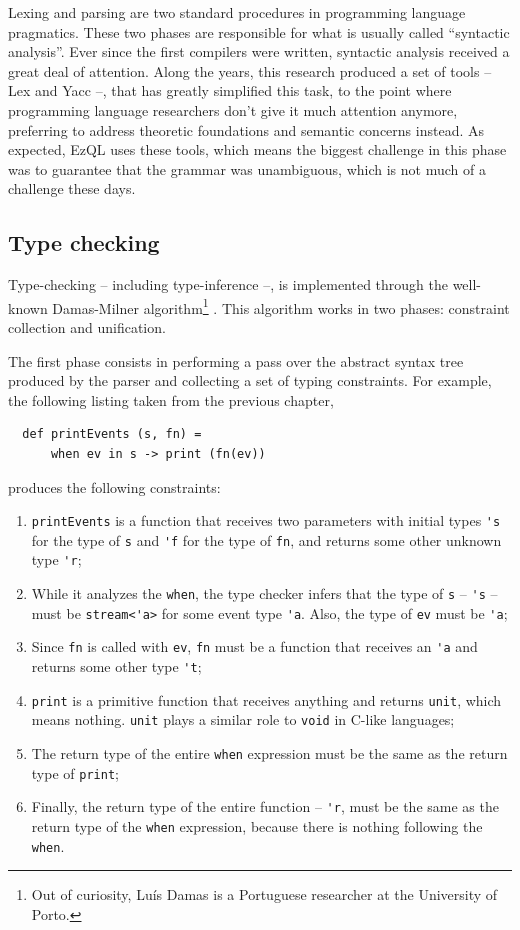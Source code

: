 Lexing and parsing are two standard procedures in programming language
pragmatics. These two phases are responsible for what is usually
called ``syntactic analysis''. Ever since the first compilers were
written, syntactic analysis received a great deal of attention. Along
the years, this research produced a set of tools -- Lex and Yacc
\cite{lex-yacc} --, that has greatly simplified this task, to the
point where programming language researchers don't give it much
attention anymore, preferring to address theoretic foundations and
semantic concerns instead. As expected, EzQL uses these tools, which
means the biggest challenge in this phase was to guarantee that the
grammar was unambiguous, which is not much of a challenge these days.

\subsection{Type checking}
\label{sub:type-checking}

Type-checking -- including type-inference --, is implemented through
the well-known Damas-Milner algorithm\footnote{Out of curiosity,
  Lu\'{i}s Damas is a Portuguese researcher at the University of
  Porto.} \cite{damas-milner}. This algorithm works in two phases:
constraint collection and unification.

The first phase consists in performing a pass over the abstract syntax
tree produced by the parser and collecting a set of typing
constraints. For example, the following listing taken from the
previous chapter,

\begin{lstlisting}
  def printEvents (s, fn) =
      when ev in s -> print (fn(ev))
\end{lstlisting}

produces the following constraints:

\begin{enumerate}
\item \verb=printEvents= is a function that receives two parameters
  with initial types \verb='s= for the type of \verb=s= and \verb='f=
  for the type of \verb=fn=, and returns some other unknown type
  \verb='r=;
\item While it analyzes the \verb=when=, the type checker infers that
  the type of \verb=s= -- \verb='s= -- must be \verb=stream<'a>= for
  some event type \verb='a=. Also, the type of \verb=ev= must be
  \verb='a=;
\item Since \verb=fn= is called with \verb=ev=, \verb=fn= must be a
  function that receives an \verb='a= and returns some other type
  \verb='t=;
\item \verb=print= is a primitive function that receives anything and
  returns \verb=unit=, which means nothing. \verb=unit= plays a
  similar role to \verb=void= in C-like languages;
\item The return type of the entire \verb=when= expression must be the
  same as the return type of \verb=print=;
\item Finally, the return type of the entire function -- \verb='r=,
  must be the same as the return type of the \verb=when= expression,
  because there is nothing following the \verb=when=.
\end{enumerate}

